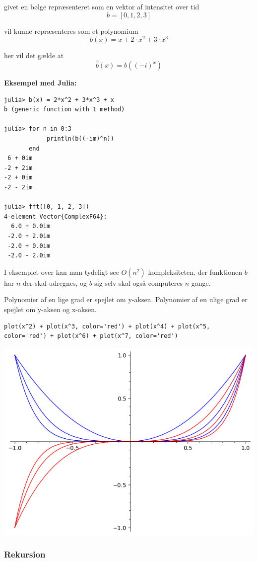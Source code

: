 \documentclass[11pt,a4paper]{article}
\begin{document}
givet en bølge repræsenteret som en vektor af intensitet over tid
$$
b = [0, 1, 2, 3]
$$

vil kunne repræsenteres som et polynomium
$$
b(x) = x + 2\cdot x^2 + 3\cdot x^3
$$

her vil det gælde at
$$
\hat{b}(x) = b((-i)^x)
$$

\textbf{Eksempel med Julia:}
\begin{verbatim}
julia> b(x) = 2*x^2 + 3*x^3 + x
b (generic function with 1 method)

julia> for n in 0:3
            println(b((-im)^n))
       end
 6 + 0im
-2 + 2im
-2 + 0im
-2 - 2im

julia> fft([0, 1, 2, 3])
4-element Vector{ComplexF64}:
  6.0 + 0.0im
 -2.0 + 2.0im
 -2.0 + 0.0im
 -2.0 - 2.0im
\end{verbatim}

I eksemplet over kan man tydeligt see \(O(n^2)\) kompleksiteten,
der funktionen \(b\) har \(n\) der skal udregnes,
og \(b\) sig selv skal også computeres \(n\) gange.

Polynomier af en lige grad er spejlet om y-aksen.
Polynomier af en ulige grad er spejlet om y-aksen og x-aksen.

\begin{verbatim}
plot(x^2) + plot(x^3, color='red') + plot(x^4) + plot(x^5, color='red') + plot(x^6) + plot(x^7, color='red')
\end{verbatim}

\begin{center}
\includegraphics[width=.9\linewidth]{even_and_odd.png}
\end{center}

\subsubsection{Rekursion}
\label{sec:orgfa873a3}
\end{document}
